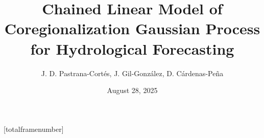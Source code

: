 \author{%
	J. D. Pastrana-Cortés, J. Gil-González, D. Cárdenas-Peña
}


\title[Chained LMC GP for Hydrological Forecasting]{\textbf{Chained Linear Model of Coregionalization Gaussian Process for Hydrological Forecasting}}
\date[2025]{August 28, 2025}



[totalframenumber]
